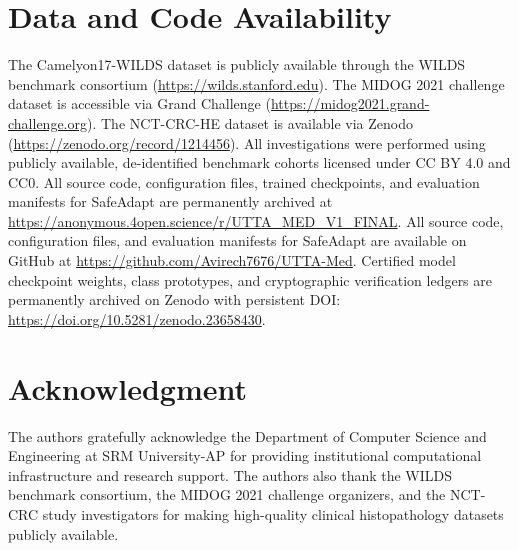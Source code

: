 \documentclass[journal]{IEEEtran}
\begin{document}
\section*{Data and Code Availability}
The Camelyon17-WILDS dataset is publicly available through the WILDS benchmark consortium (\url{https://wilds.stanford.edu}). The MIDOG 2021 challenge dataset is accessible via Grand Challenge (\url{https://midog2021.grand-challenge.org}). The NCT-CRC-HE dataset is available via Zenodo (\url{https://zenodo.org/record/1214456}). All investigations were performed using publicly available, de-identified benchmark cohorts licensed under CC BY 4.0 and CC0.
\ifblind
All source code, configuration files, trained checkpoints, and evaluation manifests for SafeAdapt are permanently archived at \url{https://anonymous.4open.science/r/UTTA_MED_V1_FINAL}.
\else
All source code, configuration files, and evaluation manifests for SafeAdapt are available on GitHub at \url{https://github.com/Avirech7676/UTTA-Med}. Certified model checkpoint weights, class prototypes, and cryptographic verification ledgers are permanently archived on Zenodo with persistent DOI: \url{https://doi.org/10.5281/zenodo.23658430}.

\section*{Acknowledgment}
The authors gratefully acknowledge the Department of Computer Science and Engineering at SRM University-AP for providing institutional computational infrastructure and research support. The authors also thank the WILDS benchmark consortium, the MIDOG 2021 challenge organizers, and the NCT-CRC study investigators for making high-quality clinical histopathology datasets publicly available.
\fi

\appendices
\end{document}
